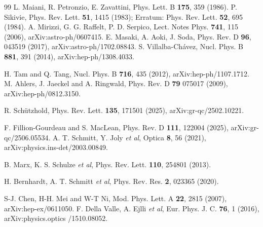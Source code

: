 \documentclass[a4paper,11pt]{article}
\begin{document}
\begin{thebibliography}{99}
L. Maiani, R. Petronzio, E. Zavattini,
Phys. Lett. B {\bf175}, 359 (1986).
P. Sikivie,
Phys. Rev. Lett. {\bf51}, 1415 (1983); Erratum: Phys. Rev. Lett. {\bf52}, 695 (1984).
A. Mirizzi, G. G. Raffelt, P. D. Serpico, 
Lect. Notes Phys. {\bf741}, 115 (2006), arXiv:astro-ph/0607415.
E. Masaki, A. Aoki, J. Soda,  %
Phys. Rev. D {\bf96}, 043519 (2017), arXiv:astro-ph/1702.08843. 
S. Villalba-Chávez,  %
Nucl. Phys. B {\bf881}, 391 (2014), arXiv:hep-ph/1308.4033.  

H. Tam and Q. Tang, %
Nucl. Phys. B {\bf716}, 435 (2012), arXiv:hep-ph/1107.1712.
M. Ahlers, J. Jaeckel and A. Ringwald, 
Phys. Rev. D {\bf 79} 075017 (2009), arXiv:hep-ph/0812.3150.

R. Sch\"utzhold, %
Phys. Rev. Lett. {\bf 135}, 171501 (2025), arXiv:gr-qc/2502.10221.

F. Fillion-Gourdeau and S. MacLean, %
Phys. Rev. D {\bf 111}, 122004 (2025), arXiv:gr-qc/2506.05534. 
A. T. Schmitt, Y. Joly  \textit{et al}, %
Optica {\bf8}, 56 (2021), arXiv:physics.ins-det/2003.00849.

B. Marx, K. S. Schulze \textit{et al}, %
 Phys. Rev. Lett. {\bf110}, 254801 (2013).
 
 H. Bernhardt, A. T. Schmitt \textit{et al}, %
Phys. Rev. Res. {\bf2}, 023365 (2020).

 S-J. Chen, H-H. Mei and W-T Ni, %
 Mod. Phys. Lett. A {\bf 22}, 2815 (2007), arXiv:hep-ex/0611050.
 F. Della Valle, A. Ejlli \textit{et al}, 
 Eur. Phys. J. C. {\bf 76}, 1 (2016), arXiv:physics.optics /1510.08052.  
 

\end{thebibliography}
\end{document}
